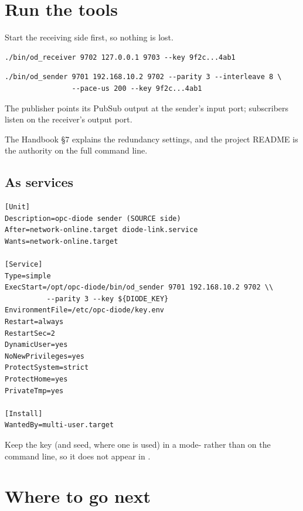 \documentclass[11pt,a4paper]{article}
\begin{document}
\section{Run the tools}

Start the receiving side first, so nothing is lost.

\begin{lstlisting}[style=shell,caption={DESTINATION side}]
./bin/od_receiver 9702 127.0.0.1 9703 --key 9f2c...4ab1
\end{lstlisting}

\begin{lstlisting}[style=shell,caption={SOURCE side}]
./bin/od_sender 9701 192.168.10.2 9702 --parity 3 --interleave 8 \
                --pace-us 200 --key 9f2c...4ab1
\end{lstlisting}

The publisher points its PubSub output at the sender's input port;
subscribers listen on the receiver's output port.

The Handbook \S7 explains the redundancy settings, and the project
README is the authority on the full command line.

\subsection{As services}

\begin{lstlisting}[style=conf,caption={\file{/etc/systemd/system/od-sender.service}}]
[Unit]
Description=opc-diode sender (SOURCE side)
After=network-online.target diode-link.service
Wants=network-online.target

[Service]
Type=simple
ExecStart=/opt/opc-diode/bin/od_sender 9701 192.168.10.2 9702 \\
          --parity 3 --key ${DIODE_KEY}
EnvironmentFile=/etc/opc-diode/key.env
Restart=always
RestartSec=2
DynamicUser=yes
NoNewPrivileges=yes
ProtectSystem=strict
ProtectHome=yes
PrivateTmp=yes

[Install]
WantedBy=multi-user.target
\end{lstlisting}

Keep the key (and seed, where one is used) in a mode-
 rather than on the command line, so it does not
appear in \cmd{ps}.

\section{Where to go next}
\end{document}
